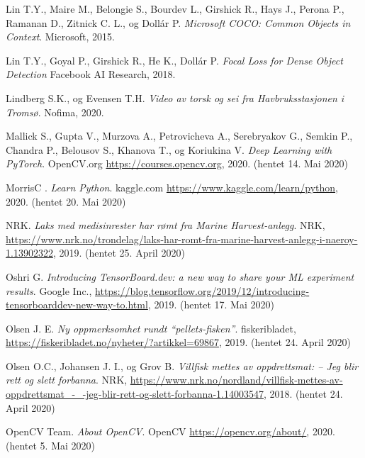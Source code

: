 \documentclass[11ot]{article}
\begin{document}
\begin{thebibliography}{9}
Lin T.Y., Maire M., Belongie S., Bourdev L., Girshick R., Hays J., Perona P., Ramanan D., Zitnick C. L., og Dollár P. 
\textit{Microsoft COCO: Common Objects in Context}. 
Microsoft, 2015.

Lin T.Y., Goyal P., Girshick R., He K., Dollár P.
\textit{Focal Loss for Dense Object Detection}
Facebook AI Research, 2018.

Lindberg S.K., og Evensen T.H.
\textit{Video av torsk og sei fra Havbruksstasjonen i Tromsø}. 
Nofima, 2020.

Mallick S., Gupta V., Murzova A., Petrovicheva A., Serebryakov G., Semkin P., Chandra P., Belousov S., Khanova T., og Koriukina V.
\textit{Deep Learning with PyTorch}. 
OpenCV.org \url{https://courses.opencv.org}, 2020. (hentet 14. Mai 2020)

MorrisC .
\textit{Learn Python}. 
kaggle.com \url{https://www.kaggle.com/learn/python}, 2020. (hentet 20. Mai 2020)


NRK. 
\textit{Laks med medisinrester har rømt fra Marine Harvest-anlegg}. 
NRK, \url{https://www.nrk.no/trondelag/laks-har-romt-fra-marine-harvest-anlegg-i-naeroy-1.13902322}, 2019. (hentet 25. April 2020)

Oshri G. 
\textit{Introducing TensorBoard.dev: a new way to share your ML experiment results}. 
Google Inc., \url{https://blog.tensorflow.org/2019/12/introducing-tensorboarddev-new-way-to.html}, 2019. (hentet 17. Mai 2020)

Olsen J. E. 
\textit{Ny oppmerksomhet rundt “pellets-fisken”}. 
fiskeribladet, \url{https://fiskeribladet.no/nyheter/?artikkel=69867}, 2019. (hentet 24. April 2020)

Olsen O.C., Johansen J. I., og Grov B. 
\textit{Villfisk mettes av oppdrettsmat: – Jeg blir rett og slett forbanna}. 
NRK, \url{https://www.nrk.no/nordland/villfisk-mettes-av-oppdrettsmat_-_-jeg-blir-rett-og-slett-forbanna-1.14003547}, 2018. (hentet 24. April 2020)

OpenCV Team. 
\textit{About OpenCV}. 
OpenCV \url{https://opencv.org/about/}, 2020. (hentet 5. Mai 2020)


\end{thebibliography}
\end{document}
